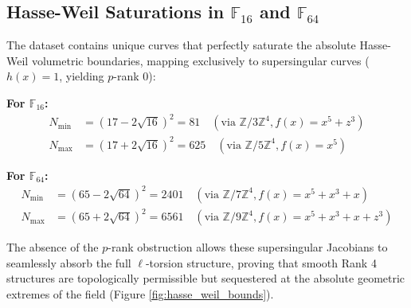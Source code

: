 \documentclass[letterpaper, 11pt]{article}
\begin{document}
\subsection{Hasse-Weil Saturations in \texorpdfstring{$\mathbb{F}_{16}$}{F\_16} and \texorpdfstring{$\mathbb{F}_{64}$}{F\_64}}
The dataset contains unique curves that perfectly saturate the absolute Hasse-Weil volumetric boundaries, mapping exclusively to supersingular curves ($h(x) = 1$, yielding $p$-rank 0):

\textbf{For $\mathbb{F}_{16}$:}
\begin{align*}
    N_{\text{min}} &= (17 - 2\sqrt{16})^2 = 81 \quad (\text{via } \mathbb{Z}/3\mathbb{Z}^4, f(x) = x^5 + z^3) \\
    N_{\text{max}} &= (17 + 2\sqrt{16})^2 = 625 \quad (\text{via } \mathbb{Z}/5\mathbb{Z}^4, f(x) = x^5)
\end{align*}

\textbf{For $\mathbb{F}_{64}$:}
\begin{align*}
    N_{\text{min}} &= (65 - 2\sqrt{64})^2 = 2401 \quad (\text{via } \mathbb{Z}/7\mathbb{Z}^4, f(x) = x^5 + x^3 + x) \\
    N_{\text{max}} &= (65 + 2\sqrt{64})^2 = 6561 \quad (\text{via } \mathbb{Z}/9\mathbb{Z}^4, f(x) = x^5 + x^3 + x + z^3)
\end{align*}

The absence of the $p$-rank obstruction allows these supersingular Jacobians to seamlessly absorb the full $\ell$-torsion structure, proving that smooth Rank 4 structures are topologically permissible but sequestered at the absolute geometric extremes of the field (Figure \ref{fig:hasse_weil_bounds}).
\end{document}
